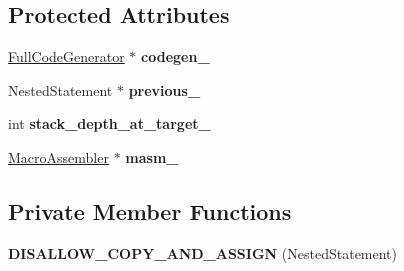 \subsection*{Protected Attributes}
\begin{DoxyCompactItemize}
\item 
\hyperlink{classv8_1_1internal_1_1_full_code_generator}{Full\+Code\+Generator} $\ast$ {\bfseries codegen\+\_\+}\hypertarget{classv8_1_1internal_1_1_full_code_generator_1_1_b_a_s_e___e_m_b_e_d_d_e_d_a79dc89f97f52f9e576c4056df561951c}{}\label{classv8_1_1internal_1_1_full_code_generator_1_1_b_a_s_e___e_m_b_e_d_d_e_d_a79dc89f97f52f9e576c4056df561951c}

\item 
Nested\+Statement $\ast$ {\bfseries previous\+\_\+}\hypertarget{classv8_1_1internal_1_1_full_code_generator_1_1_b_a_s_e___e_m_b_e_d_d_e_d_ad9a3503ac9e8d67db5b735b31a9a24ba}{}\label{classv8_1_1internal_1_1_full_code_generator_1_1_b_a_s_e___e_m_b_e_d_d_e_d_ad9a3503ac9e8d67db5b735b31a9a24ba}

\item 
int {\bfseries stack\+\_\+depth\+\_\+at\+\_\+target\+\_\+}\hypertarget{classv8_1_1internal_1_1_full_code_generator_1_1_b_a_s_e___e_m_b_e_d_d_e_d_a3962c3b49ef405446c83a9897af3376a}{}\label{classv8_1_1internal_1_1_full_code_generator_1_1_b_a_s_e___e_m_b_e_d_d_e_d_a3962c3b49ef405446c83a9897af3376a}

\item 
\hyperlink{classv8_1_1internal_1_1_macro_assembler}{Macro\+Assembler} $\ast$ {\bfseries masm\+\_\+}\hypertarget{classv8_1_1internal_1_1_full_code_generator_1_1_b_a_s_e___e_m_b_e_d_d_e_d_ad72f5bb034e77702b736545bc1152689}{}\label{classv8_1_1internal_1_1_full_code_generator_1_1_b_a_s_e___e_m_b_e_d_d_e_d_ad72f5bb034e77702b736545bc1152689}

\end{DoxyCompactItemize}
\subsection*{Private Member Functions}
\begin{DoxyCompactItemize}
\item 
{\bfseries D\+I\+S\+A\+L\+L\+O\+W\+\_\+\+C\+O\+P\+Y\+\_\+\+A\+N\+D\+\_\+\+A\+S\+S\+I\+GN} (Nested\+Statement)\hypertarget{classv8_1_1internal_1_1_full_code_generator_1_1_b_a_s_e___e_m_b_e_d_d_e_d_a3fbe5210d2df47d75fa7e0fe36765b60}{}\label{classv8_1_1internal_1_1_full_code_generator_1_1_b_a_s_e___e_m_b_e_d_d_e_d_a3fbe5210d2df47d75fa7e0fe36765b60}

\end{DoxyCompactItemize}
